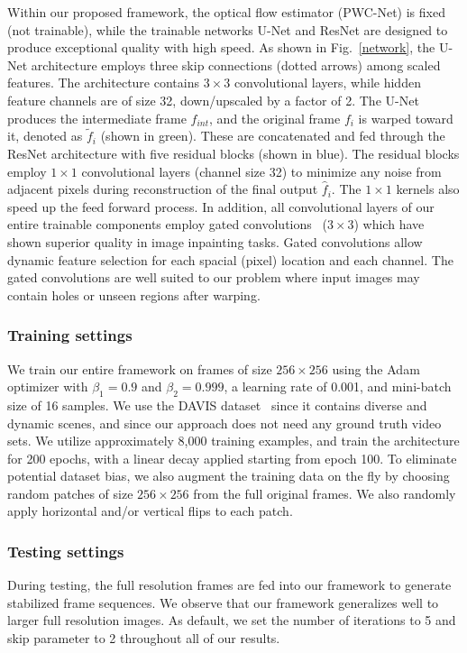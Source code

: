 Within our proposed framework, the optical flow estimator (PWC-Net) is fixed (not trainable), while the trainable networks U-Net and ResNet are designed to produce exceptional quality with high speed.
As shown in Fig.~\ref{network}, the U-Net architecture employs three skip connections (dotted arrows) among scaled features.
The architecture contains $3\times3$ convolutional layers, while hidden feature channels are of size 32, down/upscaled by a factor of 2.
The U-Net produces the intermediate frame $f_{int}$, and the original frame $f_i$ is warped toward it, denoted as $\tilde{f}_i$ (shown in green).
These are concatenated and fed through the ResNet architecture with five residual blocks (shown in blue).
The residual blocks employ $1\times1$ convolutional layers (channel size 32) to minimize any noise from adjacent pixels during reconstruction of the final output $\hat{f}_i$.
The $1\times1$ kernels also speed up the feed forward process.
In addition, all convolutional layers of our entire trainable components employ gated convolutions~\cite{yu2018free} ($3\times3$) which have shown superior quality in image inpainting tasks. 
Gated convolutions allow dynamic feature selection for each spacial (pixel) location and each channel.
The gated convolutions are well suited to our problem where input images may contain holes or unseen regions after warping.

\subsubsection{\textbf{Training settings}}
We train our entire framework on frames of size $256\times256$ using the Adam optimizer with $\beta_1=0.9$ and $\beta_2=0.999$, a learning rate of 0.001, and mini-batch size of 16 samples.
We use the DAVIS dataset~\cite{Perazzi2016} since it contains diverse and dynamic scenes, and since our approach does not need any ground truth video sets.
We utilize approximately 8,000 training examples, and train the architecture for 200 epochs, with a linear decay applied starting from epoch 100.
To eliminate potential dataset bias, we also augment the training data on the fly by choosing random patches of size $256\times256$ from the full original frames.
We also randomly apply horizontal and/or vertical flips to each patch. 

\subsubsection{\textbf{Testing settings}}
During testing, the full resolution frames are fed into our framework to generate stabilized frame sequences.
We observe that our framework generalizes well to larger full resolution images.
As default, we set the number of iterations to 5 and skip parameter to 2 throughout all of our results.





